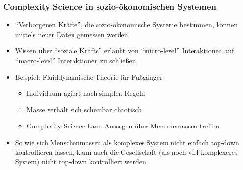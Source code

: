 \begin{frame}
	\frametitle{Complexity Science in sozio-ökonomischen Systemen}
	\begin{itemize}
		\item
			\enquote{Verborgenen Kräfte}, die sozio-ökonomische Systeme bestimmen, können  mittels neuer Daten gemessen werden
		\item
			Wissen über \enquote{soziale Kräfte} erlaubt von \enquote{micro-level} Interaktionen auf \enquote{macro-level} Interaktionen zu schließen
		\item
			Beispiel: Fluiddynamische Theorie für Fußgänger
			\begin{itemize}
				\item
					Individuum agiert nach simplen Regeln
				\item
					Masse verhält sich scheinbar chaotisch
				\item
					Complexity Science kann Aussagen über Menschemassen treffen
			\end{itemize}
		\item<2>[$\Rightarrow$]
			So wie sich Menschenmassen als komplexes System nicht einfach top-down kontrollieren lassen, kann auch die Gesellschaft (als noch viel komplexeres System) nicht top-down  kontrolliert werden
	\end{itemize}
\end{frame}

